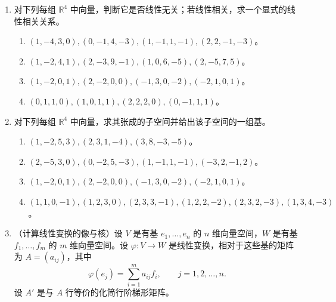 \begin{enumerate}[label=\arabic*.,resume]
\begin{enumerate}[label=(\alph*)]
\[\begin{pmatrix}
0&0&0&0&0\\
0&0&0&0&0
\end{pmatrix},
\]
其中第 $1,2,4$ 列为主元列，其余两列为非主元列。
\item 推出这些向量线性相关；由 $v_1,
\ldots,v_5$ 张成的子空间 $W$ 是 $3$ 维的，并且
\[
v_1=(1,1,3,-2,3),\quad v_2=(0,1,0,-1,0),\quad v_4=(0,3,1,-3,1)
\]
是 $W$ 的一组基。
\item 由 (a) 推出任意线性关系
\[
x_1v_1+x_2v_2+x_3v_3+x_4v_4+x_5v_5=0
\]
的系数满足
\[
x_1+2x_3+2x_5=0,
\qquad
x_2+x_3+18x_5=0,
\qquad
x_4-7x_5=0.
\]
由此推出与非主元列对应的第 $3$ 与第 $5$ 个变量 $x_3,x_5$ 可任意指定，其余变量唯一确定为
\[
x_1=-2x_3-2x_5,
\qquad
x_2=-x_3-18x_5,
\qquad
x_4=7x_5.
\]
特别地，证明
\[
-2v_1-v_2+v_3=0,
\qquad
-2v_1-18v_2+7v_4+v_5=0,
\]
分别对应于 $(x_3=1,x_5=0)$ 与 $(x_3=0,x_5=1)$。
\end{enumerate}
\item 对下列每组 $\mathbb R^4$ 中向量，判断它是否线性无关；若线性相关，求一个显式的线性相关关系。
\begin{enumerate}[label=(\alph*)]
\item $(1,-4,3,0),(0,-1,4,-3),(1,-1,1,-1),(2,2,-1,-3)$。
\item $(1,-2,4,1),(2,-3,9,-1),(1,0,6,-5),(2,-5,7,5)$。
\item $(1,-2,0,1),(2,-2,0,0),(-1,3,0,-2),(-2,1,0,1)$。
\item $(0,1,1,0),(1,0,1,1),(2,2,2,0),(0,-1,1,1)$。
\end{enumerate}
\item 对下列每组 $\mathbb R^4$ 中向量，求其张成的子空间并给出该子空间的一组基。
\begin{enumerate}[label=(\alph*)]
\item $(1,-2,5,3),(2,3,1,-4),(3,8,-3,-5)$。
\item $(2,-5,3,0),(0,-2,5,-3),(1,-1,1,-1),(-3,2,-1,2)$。
\item $(1,-2,0,1),(2,-2,0,0),(-1,3,0,-2),(-2,1,0,1)$。
\item $(1,1,0,-1),(1,2,3,0),(2,3,3,-1),(1,2,2,-2),(2,3,2,-3),(1,3,4,-3)$。
\end{enumerate}
\item （计算线性变换的像与核）设 $V$ 是有基 $e_1,\ldots,e_n$ 的 $n$ 维向量空间，$W$ 是有基 $f_1,\ldots,f_m$ 的 $m$ 维向量空间。设 $\varphi:V\to W$ 是线性变换，相对于这些基的矩阵为 $A=(a_{ij})$，其中
\[
\varphi(e_j)=\sum_{i=1}^m a_{ij}f_i,
\qquad j=1,2,\ldots,n.
\]
设 $A'$ 是与 $A$ 行等价的化简行阶梯形矩阵。
\begin{enumerate}[label=(\alph*)]

\end{enumerate}
\end{enumerate}

